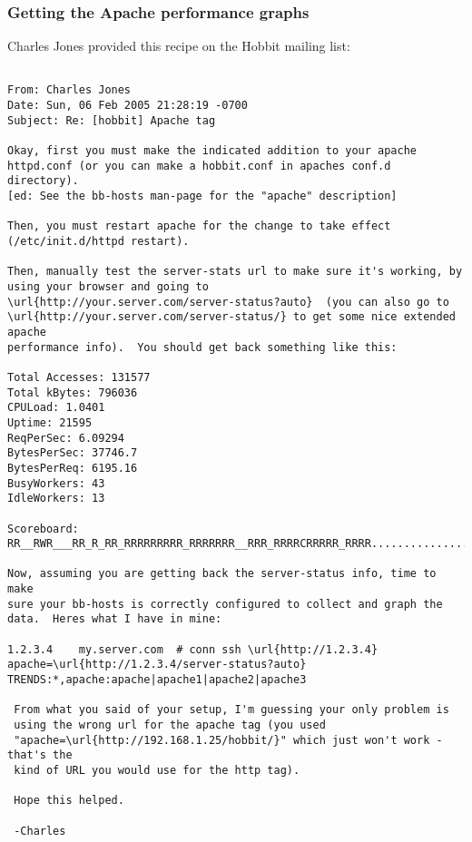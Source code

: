 \subsubsection*{Getting the Apache performance graphs}


 Charles Jones provided this recipe on the Hobbit mailing list:
\begin{verbatim}

From: Charles Jones
Date: Sun, 06 Feb 2005 21:28:19 -0700
Subject: Re: [hobbit] Apache tag

Okay, first you must make the indicated addition to your apache
httpd.conf (or you can make a hobbit.conf in apaches conf.d directory).
[ed: See the bb-hosts man-page for the "apache" description]

Then, you must restart apache for the change to take effect
(/etc/init.d/httpd restart).

Then, manually test the server-stats url to make sure it's working, by
using your browser and going to
\url{http://your.server.com/server-status?auto}  (you can also go to
\url{http://your.server.com/server-status/} to get some nice extended apache
performance info).  You should get back something like this:

Total Accesses: 131577
Total kBytes: 796036
CPULoad: 1.0401
Uptime: 21595
ReqPerSec: 6.09294
BytesPerSec: 37746.7
BytesPerReq: 6195.16
BusyWorkers: 43
IdleWorkers: 13

Scoreboard: RR__RWR___RR_R_RR_RRRRRRRRR_RRRRRRR__RRR_RRRRCRRRRR_RRRR........................................................................................................................................................................................................

Now, assuming you are getting back the server-status info, time to make
sure your bb-hosts is correctly configured to collect and graph the
data.  Heres what I have in mine:

1.2.3.4    my.server.com  # conn ssh \url{http://1.2.3.4} apache=\url{http://1.2.3.4/server-status?auto} TRENDS:*,apache:apache|apache1|apache2|apache3

 From what you said of your setup, I'm guessing your only problem is
 using the wrong url for the apache tag (you used
 "apache=\url{http://192.168.1.25/hobbit/}" which just won't work - that's the
 kind of URL you would use for the http tag).

 Hope this helped.

 -Charles

\end{verbatim}
\hline 
